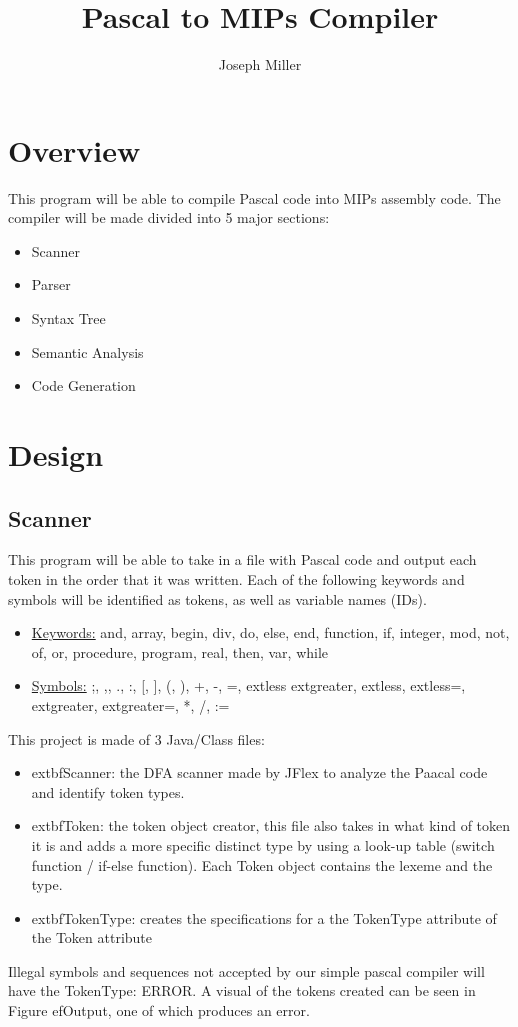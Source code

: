 \documentclass[english]{article}
\begin{document}
\title{Pascal to MIPs Compiler}
\author{Joseph Miller}
\maketitle


\section{Overview}

This program will be able to compile Pascal code into MIPs assembly code.  The compiler will be made divided into 5 major sections:

\begin{itemize}
\item
Scanner
\item
Parser
\item
Syntax Tree
\item
Semantic Analysis
\item
Code Generation
\end{itemize}


\par\addvspace{1cm}%
\section{Design}

\subsection{Scanner}

This program will be able to take in a file with Pascal code and output each token in the order that it was written. Each of the following keywords and symbols will be identified as tokens, as well as variable names (IDs).


\begin{itemize}
\item
\underline{Keywords:} and, array, begin, div, do, else, end, function, if, integer, mod, not, of, or, procedure, program, real, then, var, while
\item
\underline{Symbols:} ;, ,, ., :, [, ], (, ), +, -, =,    extless   extgreater,    extless,    extless=,    extgreater,    extgreater=, *, /, :=
\end{itemize}
This project is made of 3 Java/Class files:
\begin{itemize}

\item
   extbf{Scanner}: the DFA scanner made by JFlex to analyze the Paacal code and identify token types.
\item
   extbf{Token}: the token object creator, this file also takes in what kind of token it is and adds a more specific distinct type by using a look-up table (switch function / if-else function). Each Token object contains the lexeme and the type.
\item
   extbf{TokenType}: creates the specifications for a the TokenType attribute of the Token attribute
\end{itemize}
Illegal symbols and sequences not accepted by our simple pascal compiler will have the TokenType: ERROR. A visual of the tokens created can be seen in Figure ef{Output}, one of which produces an error.
\end{document}
